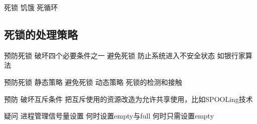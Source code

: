死锁 
饥饿
死循环

\subsection{死锁的处理策略}

预防死锁 破坏四个必要条件之一
避免死锁 防止系统进入不安全状态 如银行家算法

预防死锁 静态策略
避免死锁 动态策略
死锁的检测和接触

预防
破坏互斥条件
把互斥使用的资源改造为允许共享使用，比如SPOOLing技术



疑问 
进程管理信号量设置
何时设置empty与full
何时只需设置empty




